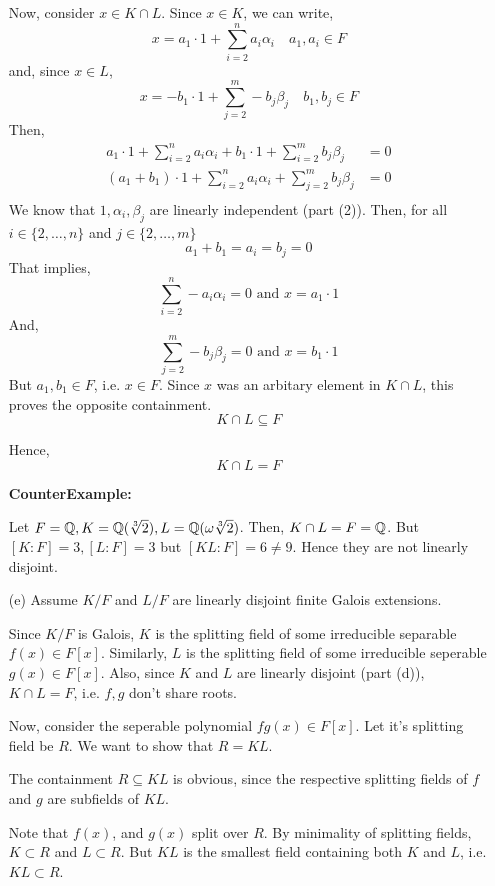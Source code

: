 \documentclass[12pt]{article}
\begin{document}
\begin{solution}
\begin{enumerate}
        Now, consider $x \in K\cap L$. Since $x \in K$, we can write, 
        \[x = a_1 \cdot 1 + \sum_{i=2}^{n} a_i \alpha_i  \quad a_1, a_i \in F \] 
        and, since $x \in L$,
        \[x = -b_1 \cdot 1 + \sum_{j=2}^{m} - b_j \beta_j \quad b_1, b_j \in F \] 
        Then, 
        \begin{align*}
        a_1 \cdot 1 + \sum_{i=2}^{n} a_i \alpha_i  + b_1 \cdot 1 + \sum_{i=2}^{m} b_j \beta_j &= 0 \\ 
        (a_1 + b_1) \cdot 1 + \sum_{i=2}^{n} a_i \alpha_i   + \sum_{j=2}^{m} b_j \beta_j &= 0 \\ 
        \end{align*}
        We know that $1, \alpha_i, \beta_j$ are linearly independent (part (2)). Then, for all $i \in \{2, \ldots, n\}$ and $j \in \{2, \ldots, m\}$
        \[ a_1 + b_1 = a_i = b_j = 0\] 
        That implies, 
        \[\sum_{i=2}^{n} - a_i \alpha_i = 0 \text{ and } x = a_1 \cdot 1\] 
        And,
        \[\sum_{j=2}^{m} - b_j \beta_j = 0 \text{ and } x = b_1 \cdot 1\] 
        But $a_1, b_1 \in F$, i.e. $x \in F$. Since $x$ was an arbitary element in $K\cap L$, this proves the opposite containment.  
        \[K \cap L \subseteq F\]
        
        Hence, 
        \[K \cap L = F\]
        
        \textbf{CounterExample:}

        Let $F = \Q, K = \Q(\sqrt[3]{2}), L=\Q(\omega\sqrt[3]{2})$. Then, $K\cap L = F = \Q$. But $[K:F] = 3, [L:F] = 3$ but $[KL:F] = 6 \neq 9$. Hence they are not linearly disjoint.

        \item[(e)] Assume $K/F$ and $L/F$ are linearly disjoint finite Galois extensions. 
        
        Since $K/F$ is Galois, $K$ is the splitting field of some irreducible separable $f(x) \in F[x]$. Similarly, $L$ is the splitting field of some irreducible seperable $g(x) \in F[x]$. Also, since $K$ and $L$ are linearly disjoint (part (d)), $K \cap L = F$, i.e. $f, g$ don't share roots.   
        
        Now, consider the seperable polynomial $fg(x) \in F[x]$. Let it's splitting field be $R$. We want to show that $R = KL$. 

        The containment $R \subseteq KL$ is obvious, since the respective splitting fields of $f$ and $g$ are subfields of $KL$. 
        
        Note that $f(x)$, and $g(x)$ split over $R$. By minimality of splitting fields, $K \subset R$ and $L \subset R$. But $KL$ is the smallest field containing both $K$ and $L$, i.e. $KL \subset R$. 


\end{enumerate}
\end{solution}
\end{document}
